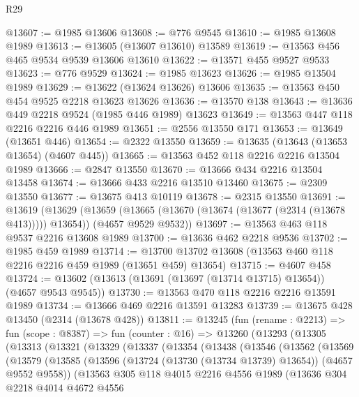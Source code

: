 \begin{lexlean}{R29}
\begin{coremodule}
@13607 := @1985 @13606
@13608 := @776 @9545
@13610 := @1985 @13608 @1989
@13613 := @13605 (@13607 @13610) @13589
@13619 := @13563 @456 @465 @9534 @9539 @13606 @13610
@13622 := @13571 @455 @9527 @9533
@13623 := @776 @9529
@13624 := @1985 @13623
@13626 := @1985 @13504 @1989
@13629 := @13622 (@13624 @13626) @13606
@13635 := @13563 @450 @454 @9525 @2218 @13623 @13626
@13636 := @13570 @138
@13643 := @13636 @449 @2218 @9524 (@1985 @446 @1989) @13623
@13649 := @13563 @447 @118 @2216 @2216 @446 @1989
@13651 := @2556 @13550 @171
@13653 := @13649 (@13651 @446)
@13654 := @2322 @13550
@13659 := @13635 (@13643 (@13653 @13654) (@4607 @445))
@13665 := @13563 @452 @118 @2216 @2216 @13504 @1989
@13666 := @2847 @13550
@13670 := @13666 @434 @2216 @13504 @13458
@13674 := @13666 @433 @2216 @13510 @13460
@13675 := @2309 @13550
@13677 := @13675 @413 @10119
@13678 := @2315 @13550
@13691 := @13619
    (@13629
      (@13659 (@13665 (@13670 (@13674 (@13677 (@2314 (@13678 @413))))) @13654))
      (@4657 @9529 @9532))
@13697 := @13563 @463 @118 @9537 @2216 @13608 @1989
@13700 := @13636 @462 @2218 @9536
@13702 := @1985 @459 @1989
@13714 := @13700 @13702 @13608 (@13563 @460 @118 @2216 @2216 @459 @1989 (@13651 @459) @13654)
@13715 := @4607 @458
@13724 := @13602 (@13613 (@13691 (@13697 (@13714 @13715) @13654)) (@4657 @9543 @9545))
@13730 := @13563 @470 @118 @2216 @2216 @13591 @1989
@13734 := @13666 @469 @2216 @13591 @13283
@13739 := @13675 @428 @13450 (@2314 (@13678 @428))
@13811 := @13245
    (fun (rename : @2213) =>
    fun (scope : @8387) =>
    fun (counter : @16) =>
    @13260
      (@13293
        (@13305
          (@13313
            (@13321
              (@13329
                (@13337
                  (@13354
                    (@13438
                      (@13546
                        (@13562
                          (@13569
                            (@13579
                              (@13585
                                (@13596
                                  (@13724 (@13730 (@13734 @13739) @13654))
                                  (@4657 @9552 @9558))
                                (@13563
                                  @305
                                  @118
                                  @4015
                                  @2216
                                  @4556
                                  @1989
                                  (@13636
                                    @304
                                    @2218
                                    @4014
                                    @4672
                                    @4556

\end{coremodule}
\end{lexlean}
